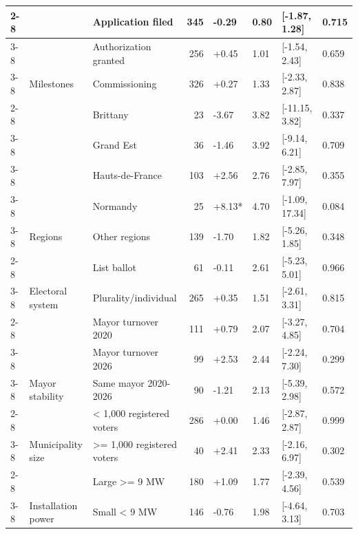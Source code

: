 \begin{ThreePartTable}
\begin{longtable}[t]{lllrllll}
\cmidrule{2-8}\nopagebreak
 &  & Application filed & 345 & -0.29 & 0.80 & {}[-1.87, 1.28] & 0.715\\
\cmidrule{3-8}\nopagebreak
 &  & Authorization granted & 256 & +0.45 & 1.01 & {}[-1.54, 2.43] & 0.659\\
\cmidrule{3-8}\nopagebreak
 & \multirow[t]{-3}{*}{\raggedright\arraybackslash Milestones} & Commissioning & 326 & +0.27 & 1.33 & {}[-2.33, 2.87] & 0.838\\
\cmidrule{2-8}\nopagebreak
 &  & Brittany & 23 & -3.67 & 3.82 & {}[-11.15, 3.82] & 0.337\\
\cmidrule{3-8}\nopagebreak
 &  & Grand Est & 36 & -1.46 & 3.92 & {}[-9.14, 6.21] & 0.709\\
\cmidrule{3-8}\nopagebreak
 &  & Hauts-de-France & 103 & +2.56 & 2.76 & {}[-2.85, 7.97] & 0.355\\
\cmidrule{3-8}\nopagebreak
 &  & Normandy & 25 & +8.13* & 4.70 & {}[-1.09, 17.34] & 0.084\\
\cmidrule{3-8}\nopagebreak
 & \multirow[t]{-5}{*}{\raggedright\arraybackslash Regions} & Other regions & 139 & -1.70 & 1.82 & {}[-5.26, 1.85] & 0.348\\
\cmidrule{2-8}\nopagebreak
 &  & List ballot & 61 & -0.11 & 2.61 & {}[-5.23, 5.01] & 0.966\\
\cmidrule{3-8}\nopagebreak
 & \multirow[t]{-2}{*}{\raggedright\arraybackslash Electoral system} & Plurality/individual & 265 & +0.35 & 1.51 & {}[-2.61, 3.31] & 0.815\\
\cmidrule{2-8}\nopagebreak
 &  & Mayor turnover 2020 & 111 & +0.79 & 2.07 & {}[-3.27, 4.85] & 0.704\\
\cmidrule{3-8}\nopagebreak
 &  & Mayor turnover 2026 & 99 & +2.53 & 2.44 & {}[-2.24, 7.30] & 0.299\\
\cmidrule{3-8}\nopagebreak
 & \multirow[t]{-3}{*}{\raggedright\arraybackslash Mayor stability} & Same mayor 2020-2026 & 90 & -1.21 & 2.13 & {}[-5.39, 2.98] & 0.572\\
\cmidrule{2-8}\nopagebreak
 &  & < 1,000 registered voters & 286 & +0.00 & 1.46 & {}[-2.87, 2.87] & 0.999\\
\cmidrule{3-8}\nopagebreak
 & \multirow[t]{-2}{*}{\raggedright\arraybackslash Municipality size} & >= 1,000 registered voters & 40 & +2.41 & 2.33 & {}[-2.16, 6.97] & 0.302\\
\cmidrule{2-8}\nopagebreak
 &  & Large >= 9 MW & 180 & +1.09 & 1.77 & {}[-2.39, 4.56] & 0.539\\
\cmidrule{3-8}\nopagebreak
 & \multirow[t]{-2}{*}{\raggedright\arraybackslash Installation power} & Small < 9 MW & 146 & -0.76 & 1.98 & {}[-4.64, 3.13] & 0.703\\

\end{longtable}
\end{ThreePartTable}
